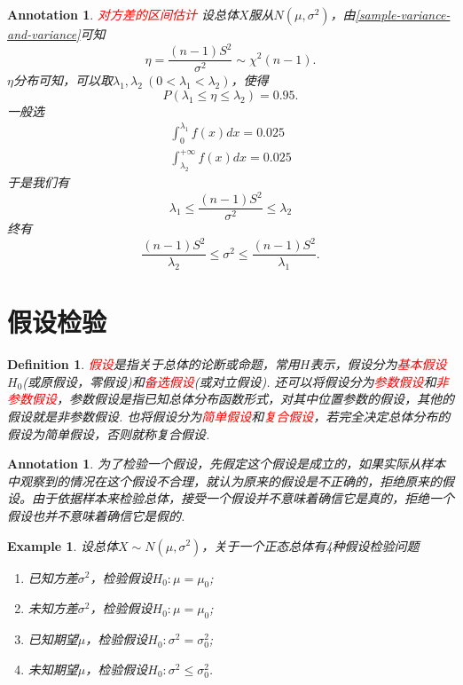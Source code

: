 \documentclass{article}
\newtheorem{example}[theorem]{Example}
\newtheorem{definition}[theorem]{Definition}
\newtheorem{annotation}[theorem]{Annotation}
\newcommand{\redt}[1]{\textcolor{red}{#1}}
\begin{document}
\begin{annotation}
\rm \redt{对方差的区间估计} 设总体$X$服从$N(\mu,\sigma^2)$，由\ref{sample-variance-and-variance}可知
$$
\eta = \frac{(n-1)S^2}{\sigma^2} \sim \chi^2(n-1).
$$
$\eta$分布可知，可以取$\lambda_1,\lambda_2~(0 < \lambda_1 < \lambda_2)$，使得
$$
P(\lambda_1 \leq \eta \leq \lambda_2) = 0.95.
$$
一般选
$$
\begin{array}{ll}
\int_{0}^{\lambda_1} f(x)dx = 0.025 \\
\int_{\lambda_2}^{+\infty} f(x)dx = 0.025
\end{array}
$$
于是我们有
$$
\lambda_1 \leq \frac{(n-1)S^2}{\sigma^2} \leq \lambda_2
$$
终有
$$
\frac{(n-1)S^2}{\lambda_2} \leq \sigma^2 \leq \frac{(n-1)S^2}{\lambda_1}. 
$$
\end{annotation}


\newpage
\section{假设检验}

\begin{definition}
\rm \redt{假设}是指关于总体的论断或命题，常用$H$表示，假设分为\redt{基本假设}$H_0$(或原假设，零假设)和\redt{备选假设}(或对立假设). 还可以将假设分为\redt{参数假设}和\redt{非参数假设}，参数假设是指已知总体分布函数形式，对其中位置参数的假设，其他的假设就是非参数假设. 也将假设分为\redt{简单假设}和\redt{复合假设}，若完全决定总体分布的假设为简单假设，否则就称复合假设.
\end{definition}

\begin{annotation}
\rm 为了检验一个假设，先假定这个假设是成立的，如果实际从样本中观察到的情况在这个假设不合理，就认为原来的假设是不正确的，拒绝原来的假设。由于依据样本来检验总体，接受一个假设并不意味着确信它是真的，拒绝一个假设也并不意味着确信它是假的. 
\end{annotation}

\begin{example}
\rm 设总体$X \sim N(\mu,\sigma^2)$，关于一个正态总体有4种假设检验问题
\begin{enumerate}
	\item 已知方差$\sigma^2$，检验假设$H_0: \mu = \mu_0$;
	\item 未知方差$\sigma^2$，检验假设$H_0: \mu = \mu_0$;
	\item 已知期望$\mu$，检验假设$H_0: \sigma^2 = \sigma_0^2$;
	\item 未知期望$\mu$，检验假设$H_0: \sigma^2 \leq \sigma_0^2$.
\end{enumerate}
\end{example}
\end{document}
